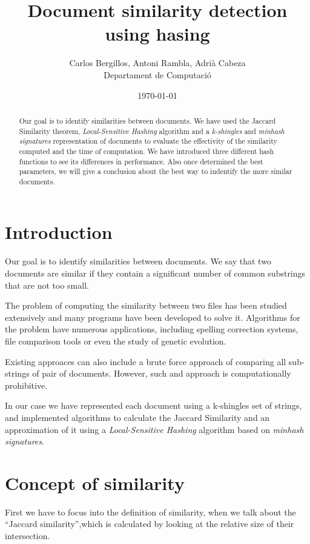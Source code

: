 \documentclass[12pt]{article}
\author{Carlos Bergillos, Antoni Rambla, Adrià Cabeza\\ Departament de Computació}
\title{Document similarity detection using hasing }
\date{\today}
\begin{document}
  \maketitle  

  \vspace{2cm}
	\begin{abstract}

Our goal is to identify similarities between documents. We have used the Jaccard Similarity theorem,  \textit{Local-Sensitive Hashing} algorithm
 and a \textit{k-shingles} and \textit{minhash signatures} representation of documents to evaluate the effectivity of the similarity computed and the time of computation. We have introduced three different hash functions to see its differences in performance.  Also  once determined the best parameters, we will give a conclusion about the best way to indentify the more similar documents. 
\end{abstract}

\newpage
\tableofcontents
\newpage

\section{Introduction}

Our goal is to identify similarities between documents. We say that two documents are similar if they contain a significant number of common substrings that are not too small. 

The problem of computing the similarity between two files has been studied extensively and many programs have been developed to solve it. Algorithms for the problem have numerous applications, including spelling correction systems, file comparison tools or even the study of genetic evolution.

 Existing approaces can also include a brute force approach of comparing all sub-strings of pair of documents. However, such and approach is computationally prohibitive. 

 In our case we have represented each document using a k-shingles set of strings, and implemented algorithms to calculate the Jaccard Similarity and an approximation of it using a \textit{Local-Sensitive Hashing} algorithm
 based on \textit{minhash signatures}.


 
\section{Concept of similarity} \label{similarity}
First we have to focus into the definition of similarity, when we talk about the ``Jaccard similarity'',which is calculated by looking at the relative size of their intersection. 
\end{document}
